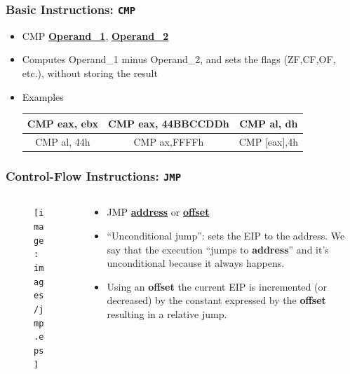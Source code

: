 \documentclass[]{beamer}
\begin{document}
\begin{frame}
  \frametitle{Basic Instructions: {\tt CMP}}
  \begin{itemize}
  \item{CMP \underline{\textbf{Operand\_1}}, \underline{\textbf{Operand\_2}}}\\

  \item{Computes Operand\_1 minus Operand\_2, and sets the flags (ZF,CF,OF, etc.), without storing the result}
  \item{Examples}
    \begin{table}[h]
      \begin{tabular}{|c|c|c|}
        \hline
        CMP eax, ebx&CMP eax, 44BBCCDDh&CMP al, dh\\
        \hline
        CMP al, 44h&CMP ax,FFFFh&CMP [eax],4h\\
        \hline
      \end{tabular}
    \end{table}
  \end{itemize}
\end{frame}
\begin{frame}
  \frametitle{Control-Flow Instructions: {\tt JMP}}
  \begin{columns}
    \begin{column}{0.4\columnwidth}
      \begin{figure}
        \texttt{[image: images/jmp.eps]}

        \label{Control Flow JMP}
      \end{figure}
    \end{column}
    \begin{column}{0.6\columnwidth}
      \begin{itemize}
      \item{JMP \underline{\textbf{address}} or \underline{\textbf{offset}}}\\

      \item{``Unconditional jump'': sets the EIP to the address. We say that the execution ``jumps to \textbf{address}'' and it's unconditional because it always happens.}
      \item{Using an \textbf{offset} the current EIP is incremented (or decreased) by the constant expressed by the \textbf{offset} resulting in a relative jump.}
      \end{itemize}
    \end{column}
  \end{columns}
\end{frame}
\end{document}
